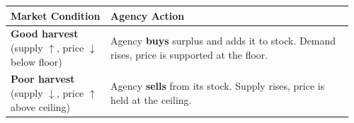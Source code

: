 \documentclass[11pt, a4paper, twoside]{book}
\begin{document}
\begin{tcolorbox}[enhanced,colback=LightBlue,colframe=MidBlue!70,arc=0pt,boxrule=0.8pt]
\begin{tabular}{@{}>{\RaggedRight\arraybackslash}p{0.28\linewidth}>{\RaggedRight\arraybackslash}p{0.68\linewidth}@{}}
\textbf{\color{NavyPrimary}Market Condition} & \textbf{\color{NavyPrimary}Agency Action} \\
\midrule
\textbf{Good harvest} (supply $\uparrow$, price $\downarrow$ below floor) & Agency \textbf{buys} surplus and adds it to stock. Demand rises, price is supported at the floor. \\
\textbf{Poor harvest} (supply $\downarrow$, price $\uparrow$ above ceiling) & Agency \textbf{sells} from its stock. Supply rises, price is held at the ceiling. \\
\end{tabular}
\end{tcolorbox}
\end{document}
